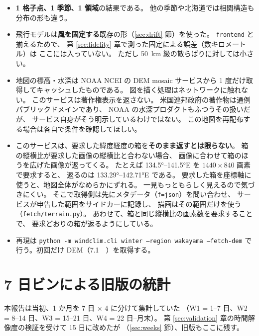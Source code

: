 \begin{itemize}
  \item \textbf{1 格子点、1 季節、1 領域}の結果である。
        他の季節や北海道では相関構造も分布の形も違う。
  \item 飛行モデルは\textbf{風を固定する}既存の形（\ref{sec:drift} 節）を使った。
        \texttt{frontend} と揃えるためで、
        第 \ref{sec:fidelity} 章で測った固定による誤差（数キロメートル）は
        ここには入っていない。
        ただし \SI{50}{\kilo\metre} 級の散らばりに対しては小さい。
  \item 地図の標高・水深は NOAA NCEI の DEM mosaic サービスから
        1 度だけ取得してキャッシュしたものである。
        図を描く処理はネットワークに触れない。
        このサービスは著作権表示を返さない。
        米国連邦政府の著作物は通例パブリックドメインであり、
        NOAA の水深プロダクトもふつうその扱いだが、
        サービス自身がそう明示しているわけではない。
        この地図を再配布する場合は各自で条件を確認してほしい。
  \item このサービスは、要求した緯度経度の箱を\textbf{そのまま返すとは限らない}。
        箱の縦横比が要求した画像の縦横比と合わない場合、
        画像に合わせて箱のほうを広げた画像が返ってくる。
        たとえば \ang{134.5}--\ang{141.5}E を $1440 \times 840$ 画素で要求すると、
        返るのは \ang{133.29}--\ang{142.71}E である。
        要求した箱を座標軸に使うと、地図全体がなめらかにずれる。
        一見もっともらしく見えるので気づきにくい。
        そこで取得側は先にメタデータ（\texttt{f=json}）を問い合わせ、
        サービスが申告した範囲をサイドカーに記録し、
        描画はその範囲だけを使う（\texttt{fetch/terrain.py}）。
        あわせて、箱と同じ縦横比の画素数を要求することで、
        要求どおりの箱が返るようにしている。
  \item 再現は \texttt{python -m windclim.cli winter --region wakayama --fetch-dem}
        で行う。初回だけ DEM（\SI{7.1}{\mega\byte}）を取得する。
\end{itemize}

\section{7 日ビンによる旧版の統計}
\label{sec:appendix-week}

本報告は当初、1 か月を 7 日 $\times$ 4 に分けて集計していた
（W1 = 1--7 日、W2 = 8--14 日、W3 = 15--21 日、W4 = 22 日--月末）。
第 \ref{sec:validation} 章の時間解像度の検証を受けて 15 日に改めたが
（\ref{sec:weeks} 節）、旧版もここに残す。

